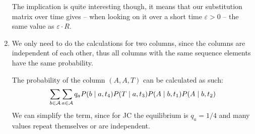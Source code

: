\begin{enumerate}[label=(\alph*)]
  The implication is quite interesting though, it means that our substitution
  matrix over time gives -- when looking on it over a short time
  \(\varepsilon>0\) -- the same value as \(\varepsilon\cdot R\).
\item We only need to do the calculations for two columns, since the columns are
  independent of each other, thus all columns with the same sequence elements
  have the same probability.

  The probability of the column \((A,A,T)\) can be calculated as such:
  \[
    \sum_{b\in\mathcal{A}} \sum_{a\in\mathcal{A}} q_a
      P(b\mid a, t_4) P(T \mid a, t_3) P(A\mid b, t_1) P(A\mid b, t_2)
  \]
  We can simplify the term, since for JC the equilibrium is \(q_a=1/4\) and
  many values repeat themselves or are independent.
\end{enumerate}







